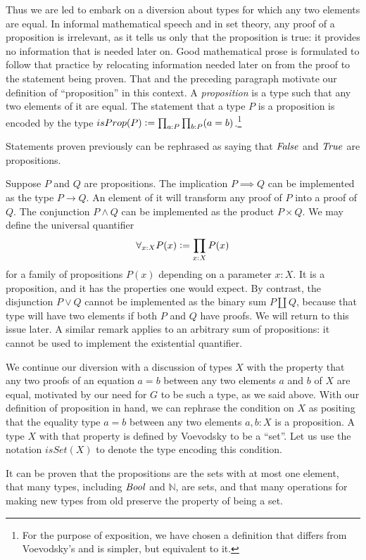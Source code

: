 \documentclass[letter,12pt]{amsart}
\theoremstyle{definition}
\theoremstyle{remark}
\numberwithin{equation}{section}
\newcommand{\bool}{\mathop{{\it Bool}}}
\newcommand{\true}{\mathop{{\it True}}}
\newcommand{\false}{\mathop{{\it False}}}
\newcommand{\NN}{\mathbb{N}}
\newcommand{\defeq}{\vcentcolon=}
\begin{document}
Thus we are led to embark on a diversion about types for which any two elements are equal.  In informal mathematical speech and in set theory,
any proof of a proposition is irrelevant, as it tells us only that the proposition is true: it provides no information that is needed later on.
Good mathematical prose is formulated to follow that practice by relocating information needed later on from the proof to the statement
being proven.  That and the preceding paragraph motivate our definition of ``proposition'' in this context.  A {\em proposition} is a type such
that any two elements of it are equal.  The statement that a type $P$ is a proposition is encoded by the type $isProp(P) \defeq \prod_{a:P}
\prod_{b:P} (a=b)$.\footnote{For the purpose of exposition, we have chosen a definition that differs from Voevodsky's and is simpler, but equivalent
  to it.}

Statements proven previously can be rephrased as saying that $\false$ and $\true$ are propositions.

Suppose $P$ and $Q$ are propositions.  The implication $P \implies Q$ can be implemented as the type $P \to Q$.  An element of it will transform
any proof of $P$ into a proof of $Q$.  The conjunction $P \wedge Q$ can be implemented as the product $P \times Q$.
We may define the universal quantifier $$\forall _{x:X} P(x) \defeq \prod _{x:X} P(x)$$ for a family of propositions $P(x)$ depending on a parameter
$x:X$.  It is a proposition, and it has the properties one would expect.
By contrast, the disjunction
$P \vee Q$ cannot be implemented as the binary sum $P \amalg Q$, because that type will have two elements if both $P$ and $Q$ have proofs.  We
will return to this issue later.  A similar remark applies to an arbitrary sum of propositions: it cannot be used to implement the
existential quantifier.

We continue our diversion with a discussion of types $X$ with the property that any two proofs of an equation $a=b$ between any two elements $a$
and $b$ of $X$ are equal, motivated by our need for $G$ to be such a type, as we said above.  With our definition of proposition in hand, we can rephrase the
condition on $X$ as positing that the equality type $a=b$ between any two elements $a,b:X$ is a proposition.  A type $X$ with that property is
defined by Voevodsky to be a ``set''.  Let us use the notation $isSet(X)$ to denote the type encoding this condition.

It can be proven that the propositions are the sets with at most one element, that many types, including $\bool$ and $\NN$, are sets, and that
many operations for making new types from old preserve the property of being a set.
\end{document}
